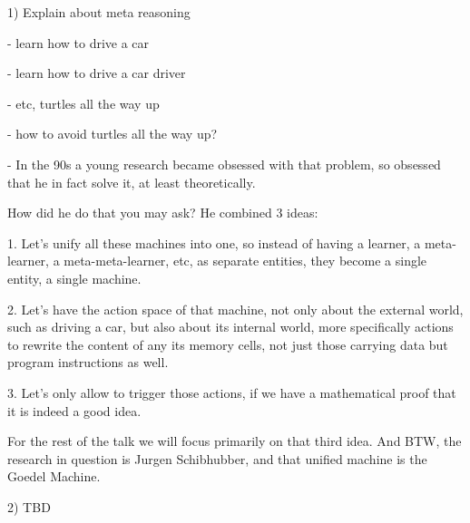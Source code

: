 1) Explain about meta reasoning

- learn how to drive a car

- learn how to drive a car driver

- etc, turtles all the way up

- how to avoid turtles all the way up?

- In the 90s a young research became obsessed with that
problem, so obsessed that he in fact solve it, at least theoretically.

How did he do that you may ask?  He combined 3 ideas:

1. Let's unify all these machines into one, so instead of having a
learner, a meta-learner, a meta-meta-learner, etc, as separate
entities, they become a single entity, a single machine.

2. Let's have the action space of that machine, not only about the
external world, such as driving a car, but also about its internal
world, more specifically actions to rewrite the content of any its
memory cells, not just those carrying data but program instructions as well.

3. Let's only allow to trigger those actions, if we have a
mathematical proof that it is indeed a good idea.

For the rest of the talk we will focus primarily on that third idea.
And BTW, the research in question is Jurgen Schibhubber, and that
unified machine is the Goedel Machine.

2) TBD
